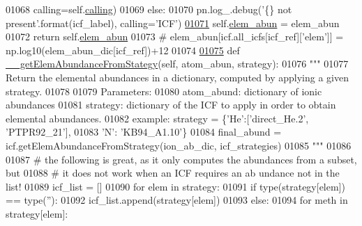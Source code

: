 \begin{DoxyCode}
{{{01068                                          calling=self.\hyperlink{classpyneb_1_1core_1_1icf_1_1_i_c_f_aaeb9b3827ef557a32b109baef31da77f}{calling})
01069                 \textcolor{keywordflow}{else}:
01070                     pn.log\_.debug(\textcolor{stringliteral}{'\{\} not present'}.format(icf\_label), calling=\textcolor{stringliteral}{'ICF'})
\hypertarget{icf_8py_source_l01071}{}\hyperlink{classpyneb_1_1core_1_1icf_1_1_i_c_f_a59ea6760bd6a09a66dc47b47bcec55c0}{01071}         self.\hyperlink{classpyneb_1_1core_1_1icf_1_1_i_c_f_a59ea6760bd6a09a66dc47b47bcec55c0}{elem\_abun} = elem\_abun
01072         \textcolor{keywordflow}{return} self.\hyperlink{classpyneb_1_1core_1_1icf_1_1_i_c_f_a59ea6760bd6a09a66dc47b47bcec55c0}{elem\_abun}
01073 \textcolor{comment}{#            elem\_abun[icf.all\_icfs[icf\_ref]['elem']] = np.log10(elem\_abun\_dic[icf\_ref])+12}
01074 
\hypertarget{icf_8py_source_l01075}{}\hyperlink{classpyneb_1_1core_1_1icf_1_1_i_c_f_ad5ac374b51b72067f8be614aa31b73e2}{01075}     \textcolor{keyword}{def }\hyperlink{classpyneb_1_1core_1_1icf_1_1_i_c_f_ad5ac374b51b72067f8be614aa31b73e2}{\_\_getElemAbundanceFromStategy}(self, atom\_abun, strategy):
01076         \textcolor{stringliteral}{"""}
01077 \textcolor{stringliteral}{        Return the elemental abundances in a dictionary, computed by applying a given strategy.}
01078 \textcolor{stringliteral}{        }
01079 \textcolor{stringliteral}{        Parameters:}
01080 \textcolor{stringliteral}{            atom\_abund: dictionary of ionic abundances}
01081 \textcolor{stringliteral}{            strategy: dictionary of the ICF to apply in order to obtain elemental abundances.}
01082 \textcolor{stringliteral}{                example: strategy = \{'He':['direct\_He.2', 'PTPR92\_21'], }
01083 \textcolor{stringliteral}{                                   'N': 'KB94\_A1.10'\}}
01084 \textcolor{stringliteral}{            final\_abund = icf.getElemAbundanceFromStrategy(ion\_ab\_dic, icf\_strategies)}
01085 \textcolor{stringliteral}{        """}
01086         
01087         \textcolor{comment}{# the following is great, as it only computes the abundances from a subset, but}
01088         \textcolor{comment}{# it does not work when an ICF requires an ab undance not in the list!}
01089         icf\_list = []
01090         \textcolor{keywordflow}{for} elem \textcolor{keywordflow}{in} strategy:
01091             \textcolor{keywordflow}{if} type(strategy[elem]) == type(\textcolor{stringliteral}{''}):
01092                 icf\_list.append(strategy[elem])
01093             \textcolor{keywordflow}{else}:
01094                 \textcolor{keywordflow}{for} meth \textcolor{keywordflow}{in} strategy[elem]:
}}}
\end{DoxyCode}

